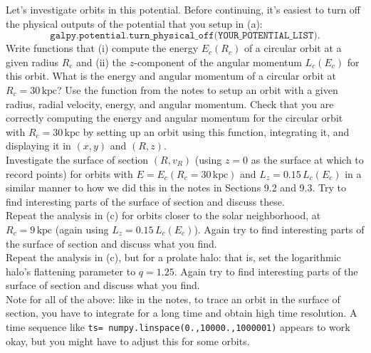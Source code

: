 \documentclass[12pt]{article}
\begin{document}
 Let's investigate orbits in this potential. Before
continuing, it's easiest to turn off the physical outputs of the
potential that you setup in (a):
\[\texttt{galpy.potential.turn\_physical\_off(YOUR\_POTENTIAL\_LIST)}.\] Write
functions that (i) compute the energy $E_c(R_c)$ of a circular orbit
at a given radius $R_c$ and (ii) the $z$-component of the angular
momentum $L_c(E_c)$ for this orbit. What is the energy and angular
momentum of a circular orbit at $R_c = 30\,\mathrm{kpc}$? Use the
function from the notes to setup an orbit with a given radius, radial
velocity, energy, and angular momentum. Check that you are correctly
computing the energy and angular momentum for the circular orbit with
$R_c = 30\,\mathrm{kpc}$ by setting up an orbit using this function,
integrating it, and displaying it in $(x,y)$ and $(R,z)$.\\

 Investigate the surface of section $(R,v_R)$ (using
$z=0$ as the surface at which to record points) for orbits with $E =
E_c(R_c = 30\,\mathrm{kpc})$ and $L_z = 0.15\,L_c(E_c)$ in a similar
manner to how we did this in the notes in Sections 9.2 and 9.3. Try to
find interesting parts of the surface of section and discuss these.\\

 Repeat the analysis in (c) for orbits closer to the
solar neighborhood, at $R_c=9\,\mathrm{kpc}$ (again using $L_z =
0.15\,L_c(E_c)$). Again try to find interesting parts of the surface
of section and discuss what you find.\\

 Repeat the analysis in (c), but for a prolate halo:
that is, set the logarithmic halo's flattening parameter to $q=1.25$.
Again try to find interesting parts of the surface of section and
discuss what you find.\\

Note for all of the above: like in the notes, to trace an orbit in the
surface of section, you have to integrate for a long time and obtain
high time resolution. A time sequence like \texttt{ts=
  numpy.linspace(0.,10000.,1000001)} appears to work okay, but you
might have to adjust this for some orbits.
\end{document}
